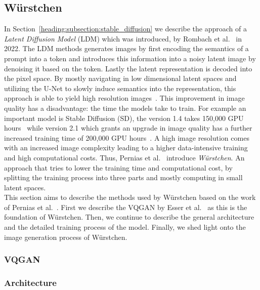 \subsection{W\"urstchen}
In Section~\ref{heading:subsection:stable_diffusion} we describe the approach
of a \emph{Latent Diffusion Model} (LDM) which was introduced,
by Rombach et al.~\cite{rombach2022stablediffusion} in 2022. The LDM methods
generates images by first encoding the semantics of a prompt into a token and
introduces this information into a noisy latent image by denoising
it based on the token. Lastly the latent representation is decoded into the
pixel space. By mostly navigating in low dimensional latent spaces and
utilizing the U-Net to slowly induce semantics into the representation, this
approach is able to yield high resolution images~\cite{rombach2022stablediffusion}.
This improvement in image quality has a disadvantage: the time the models take
to train. For example an important model is Stable Diffusion (SD), the version
1.4 takes 150,000 GPU hours~\cite{rombach2022sd_1_4} while version 2.1 which
grants an upgrade in image quality has a further increased training time of
200,000 GPU hours~\cite{rombach2023sd_2_1}. A high image resolution comes with
an increased image complexity leading to a higher data-intensive training and
high computational costs. Thus, Pernias et al.~\cite{pernias2024wrstchen}
introduce \emph{W\"urstchen}. An approach that tries to lower the training time
and computational cost, by splitting the training process into three parts and
mostly computing in small latent spaces.\\

This section aims to describe the methods used by W\"urstchen based on the work
of Pernias et al.~\cite{pernias2024wrstchen}. First we describe the VQGAN by
Esser et al.~\cite{esser2021tamingtransformershighresolutionimage} as this is
the foundation of W\"urstchen. Then, we continue to describe the general
architecture and the detailed training process of the model. Finally, we shed
light onto the image generation process of W\"urstchen.

\subsubsection{VQGAN}

\subsubsection{Architecture}


